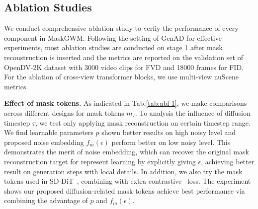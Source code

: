 \subsection{Ablation Studies}
\label{sec:ablation}
We conduct comprehensive ablation study to verfiy the performance of every component in MaskGWM. Following the setting of GenAD for effective experiments, most ablation studies are conducted on stage 1 after mask reconstruction is inserted and the metrics are reported on the validation set of OpenDV-2K dataset with 3000 video clips for FVD and 18000 frames for FID. For the ablation of cross-view transformer blocks, we use multi-view nuScene metrics.

\noindent \textbf{Effect of mask tokens.} As indicated in Tab.\ref{tab:abl-1}, we make comparisons across different designs for mask tokens $m_\tau$. To analysis the influence of diffusion timestep $\tau$, we test only applying mask reconstruction on certain timestep range. We find learnable parameters $p$ shown better results on high noisy level and proposed noise embedding $f_m(\epsilon)$ perform better on low noisy level. This demonstrates the merit of noise embedding, which can recover the original mask reconstruction target for represent learning by explicitly giving $\epsilon$, achieving better result on generation steps with local details. In addition, we also try the mask tokens used in SD-DiT~\cite{sd_dit}, combining with extra contrastive~\cite{caron2021emerging} loss. The experiment shows our proposed diffusion-related mask tokens achieve best performance via combining the advantage of $p$ and $f_m(\epsilon)$.

